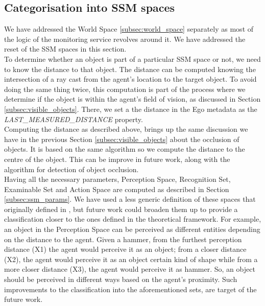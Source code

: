\subsection{Categorisation into SSM spaces}\label{subsec:categorisation_ssm_spaces}
We have addressed the World Space \ref{subsec:world_space} separately as most of the logic of the monitoring service revolves around it. We have addressed the reset of the SSM spaces in this section.\\

To determine whether an object is part of a particular SSM space or not, we need to know the distance to that object. The distance can be computed knowing the intersection of a ray cast from the agent's location to the target object. To avoid doing the same thing twice, this computation is part of the process where we determine if the object is within the agent's field of vision, as discussed in Section \ref{subsec:visible_objects}. There, we set a the distance in the Ego metadata as the \emph{LAST\_MEASURED\_DISTANCE} property.\\

Computing the distance as described above, brings up the same discussion we have in the previous Section \ref{subsec:visible_objects} about the occlusion of objects. It is based on the same algorithm so we compute the distance to the centre of the object. This can be improve in future work, along with the algorithm for detection of object occlusion.\\

Having all the necessary parameters, Perception Space, Recognition Set, Examinable Set and Action Space are computed as described in Section \ref{subsec:ssm_params}. We have used a less generic definition of these spaces that originally defined in \cite{pederson2011situative}, but future work could broaden them up to provide a classification closer to the ones defined in the theoretical framework. For example, an object in the Perception Space can be perceived as different entities depending on the distance to the agent. Given a hammer, from the furthest perception distance (X1) the agent would perceive it as an object; from a closer distance (X2), the agent would perceive it as an object certain kind of shape while from a more closer distance (X3),  the agent would perceive it as hammer. So, an object should be perceived in different ways based on the agent's proximity. Such improvements to the classification into the aforementioned sets, are target of the future work.\\

